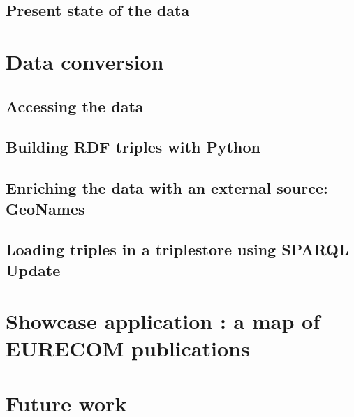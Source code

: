 \documentclass[a4paper,11pt]{report}
\begin{document}
\section{Present state of the data}



\chapter{Data conversion}
\section{Accessing the data} 
\section{Building RDF triples with Python}
\section{Enriching the data with an external source: GeoNames}
\section{Loading triples in a triplestore using SPARQL Update}



\chapter{Showcase application : a map of EURECOM publications}



\chapter{Future work}

\end{document}
